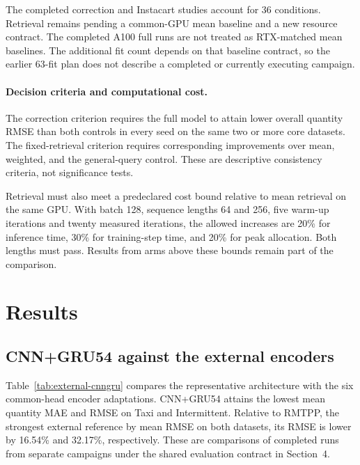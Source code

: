 \documentclass[runningheads]{llncs}
\begin{document}
The completed correction and Instacart studies account for 36 conditions. Retrieval remains pending a common-GPU mean baseline and a new resource contract. The completed A100 full runs are not treated as RTX-matched mean baselines. The additional fit count depends on that baseline contract, so the earlier 63-fit plan does not describe a completed or currently executing campaign.

\paragraph{Decision criteria and computational cost.}
The correction criterion requires the full model to attain lower overall quantity RMSE than both controls in every seed on the same two or more core datasets. The fixed-retrieval criterion requires corresponding improvements over mean, weighted, and the general-query control. These are descriptive consistency criteria, not significance tests.

Retrieval must also meet a predeclared cost bound relative to mean retrieval on the same GPU. With batch 128, sequence lengths 64 and 256, five warm-up iterations and twenty measured iterations, the allowed increases are 20\% for inference time, 30\% for training-step time, and 20\% for peak allocation. Both lengths must pass. Results from arms above these bounds remain part of the comparison.

\section{Results}
\subsection{CNN+GRU54 against the external encoders}
Table~\ref{tab:external-cnngru} compares the representative architecture with the six common-head encoder adaptations. CNN+GRU54 attains the lowest mean quantity MAE and RMSE on Taxi and Intermittent. Relative to RMTPP, the strongest external reference by mean RMSE on both datasets, its RMSE is lower by 16.54\% and 32.17\%, respectively. These are comparisons of completed runs from separate campaigns under the shared evaluation contract in Section~4.
\end{document}
